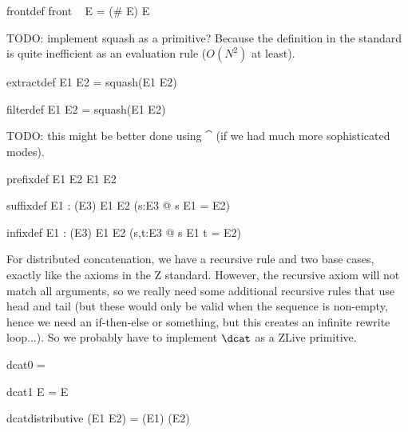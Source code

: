 \documentclass{article}
\begin{document}
\begin{zedrule}{frontdef}
   front ~ E = (\# E) \ndres E
\end{zedrule}

TODO: implement squash as a primitive?
Because the definition in the standard is quite inefficient as
an evaluation rule ($O(N^2)$ at least). 

\begin{zedrule}{extractdef}
   E1 \extract E2 = squash(E1 \dres E2)
\end{zedrule}

\begin{zedrule}{filterdef}
   E1 \filter E2 = squash(E1 \rres E2)
\end{zedrule}

TODO: this might be better done using $\cat$
(if we had much more sophisticated modes).
\begin{zedrule}{prefixdef}
   E1 \prefix E2 \iff E1 \subseteq E2
\end{zedrule}

\begin{zedrule}{suffixdef}
   \proviso E1 : \power (\arithmos \cross E3)
\derives
   E1 \suffix E2 \iff (\exists s:\seq E3 @ s \cat E1 = E2)
\end{zedrule}

\begin{zedrule}{infixdef}
   \proviso E1 : \power (\arithmos \cross E3)
\derives
   E1 \infix E2 \iff (\exists s,t:\seq E3 @ s \cat E1 \cat t = E2)
\end{zedrule}

For distributed concatenation, we have a recursive rule and
two base cases, exactly like the axioms in the Z standard.
However, the recursive axiom will not match all arguments,
so we really need some additional recursive rules that use 
head and tail (but these would only be valid when the sequence
is non-empty, hence we need an if-then-else or something, but this
creates an infinite rewrite loop...).  So we probably have to
implement $\dcat$ as a ZLive primitive. 
\begin{zedrule}{dcat0}
   \dcat \langle \rangle = \langle \rangle
\end{zedrule}
\begin{zedrule}{dcat1}
   \dcat \langle E \rangle = E
\end{zedrule}
\begin{zedrule}{dcatdistributive}
   \dcat (E1 \cat E2) = (\dcat E1) \cat (\dcat E2)
\end{zedrule}
\end{document}
